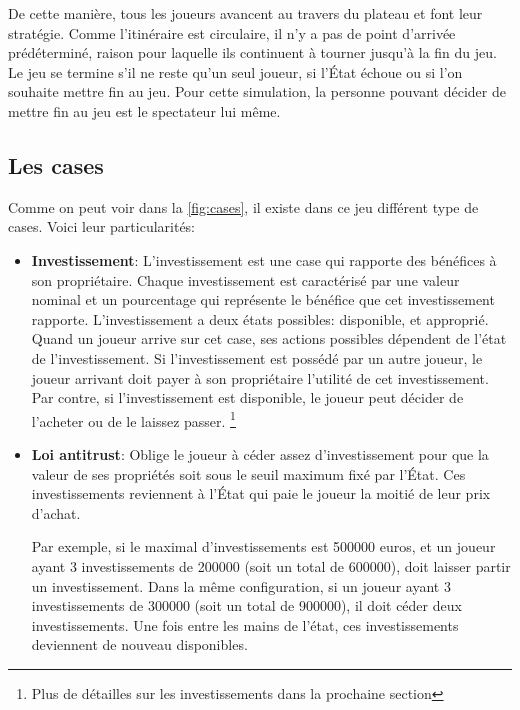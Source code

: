 \documentclass[12pt]{article}
\begin{document}
De cette manière, tous les joueurs avancent au travers du plateau et font leur stratégie. 
Comme l'itinéraire est circulaire, il n'y a pas de point d'arrivée prédéterminé,
raison pour laquelle ils continuent à tourner jusqu'à la fin du jeu. 
Le jeu se termine s'il ne reste qu'un seul joueur, si l'État échoue ou si l'on souhaite mettre fin au jeu.
Pour cette simulation, la personne pouvant décider de mettre fin au jeu est le spectateur lui même.

    
    \subsection{Les cases}
  
    	Comme on peut voir dans la \autoref{fig:cases}, il existe dans ce jeu différent type de cases. Voici leur particularités:
    \begin{itemize}
        \item \textbf{Investissement}: L'investissement est une case qui rapporte des bénéfices à son propriétaire.
        	Chaque investissement est caractérisé par une valeur nominal et un pourcentage qui représente le bénéfice que cet investissement rapporte. 
		L'investissement a deux états possibles: disponible, et approprié.
		Quand un joueur arrive sur cet case, ses actions possibles dépendent de l'état de l'investissement.
		Si l'investissement est possédé par un autre joueur, le joueur arrivant doit payer à son propriétaire l'utilité de cet investissement.
		Par contre, si l'investissement est disponible, le joueur peut décider de l'acheter ou de le laissez passer. \footnote{ Plus de détailles sur les investissements dans la prochaine section }
		
	
        \item \textbf{Loi antitrust}: Oblige le joueur à céder assez d'investissement pour que la valeur de ses propriétés soit sous le seuil maximum fixé par l'État. 
    Ces investissements reviennent à l'État qui paie le joueur la moitié de leur prix d'achat. 

    Par exemple, si le maximal d'investissements est 500000 euros, et un joueur ayant 3 investissements de 200000 (soit un total de 600000), doit laisser partir un investissement.  
    Dans la même configuration, si un joueur ayant 3 investissements de 300000 (soit un total de 900000), il doit céder deux investissements. 
    Une fois entre les mains de l'état, ces investissements deviennent de nouveau disponibles.


\end{itemize}
\end{document}
